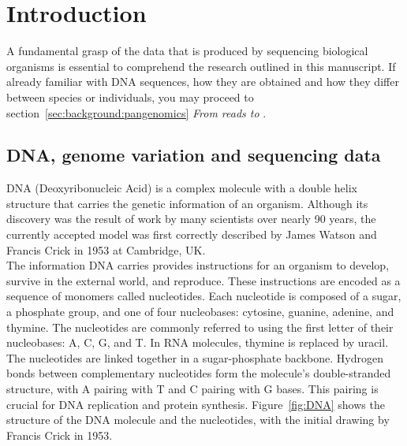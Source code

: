 \chapter{Introduction}
\label{sec:background}
A fundamental grasp of the data that is produced by sequencing biological organisms is essential to comprehend the research outlined in this manuscript. If already familiar with DNA sequences, how they are obtained and how they differ between species or individuals, you may proceed to section~\ref{sec:background:pangenomics} \emph{From reads to \kmers}.
\section{DNA, genome variation and sequencing data}
\label{sec:dna}
DNA (Deoxyribonucleic Acid) is a complex molecule with a double helix structure that carries the genetic information of an organism. Although its discovery was the result of work by many scientists over nearly 90 years, the currently accepted model was first correctly described by James Watson and Francis Crick in 1953 at Cambridge, UK.\\
The information DNA carries provides instructions for an organism to develop, survive in the external world, and reproduce. These instructions are encoded as a sequence of monomers called nucleotides. Each nucleotide is composed of a sugar, a phosphate group, and one of four nucleobases: cytosine, guanine, adenine, and thymine. The nucleotides are commonly referred to using the first letter of their nucleobases: A, C, G, and T. In RNA molecules, thymine is replaced by uracil.\\
The nucleotides are linked together in a sugar-phosphate backbone. Hydrogen bonds between complementary nucleotides form the molecule's double-stranded structure, with A pairing with T and C pairing with G bases. This pairing is crucial for DNA replication and protein synthesis. Figure~\ref{fig:DNA} shows the structure of the DNA molecule and the nucleotides, with the initial drawing by Francis Crick in 1953.
